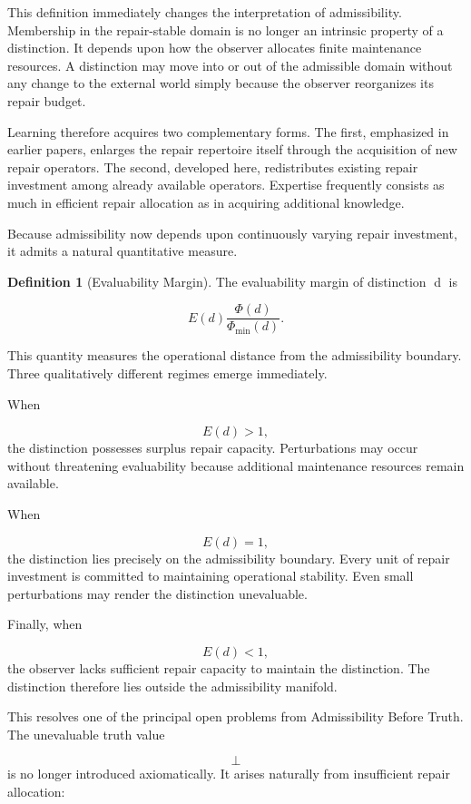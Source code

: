 \documentclass[12pt,oneside]{article}
\theoremstyle{plain}
\theoremstyle{definition}
\newtheorem{definition}[theorem]{Definition}
\theoremstyle{remark}
\begin{document}
This definition immediately changes the interpretation of admissibility. Membership in the repair-stable domain is no longer an intrinsic property of a distinction. It depends upon how the observer allocates finite maintenance resources. A distinction may move into or out of the admissible domain without any change to the external world simply because the observer reorganizes its repair budget.

Learning therefore acquires two complementary forms. The first, emphasized in earlier papers, enlarges the repair repertoire itself through the acquisition of new repair operators. The second, developed here, redistributes existing repair investment among already available operators. Expertise frequently consists as much in efficient repair allocation as in acquiring additional knowledge.

Because admissibility now depends upon continuously varying repair investment, it admits a natural quantitative measure.

\begin{definition}[Evaluability Margin]
The evaluability margin of distinction d is

\[
E(d)
\frac{\Phi(d)}
{\Phi_{\min}(d)}.
\]
\end{definition}

This quantity measures the operational distance from the admissibility boundary. Three qualitatively different regimes emerge immediately.

When

\[
E(d)>1,
\]
the distinction possesses surplus repair capacity. Perturbations may occur without threatening evaluability because additional maintenance resources remain available.

When

\[
E(d)=1,
\]
the distinction lies precisely on the admissibility boundary. Every unit of repair investment is committed to maintaining operational stability. Even small perturbations may render the distinction unevaluable.

Finally, when

\[
E(d)<1,
\]
the observer lacks sufficient repair capacity to maintain the distinction. The distinction therefore lies outside the admissibility manifold.

This resolves one of the principal open problems from Admissibility Before Truth. The unevaluable truth value

\[
\perp
\]
is no longer introduced axiomatically. It arises naturally from insufficient repair allocation:
\end{document}

